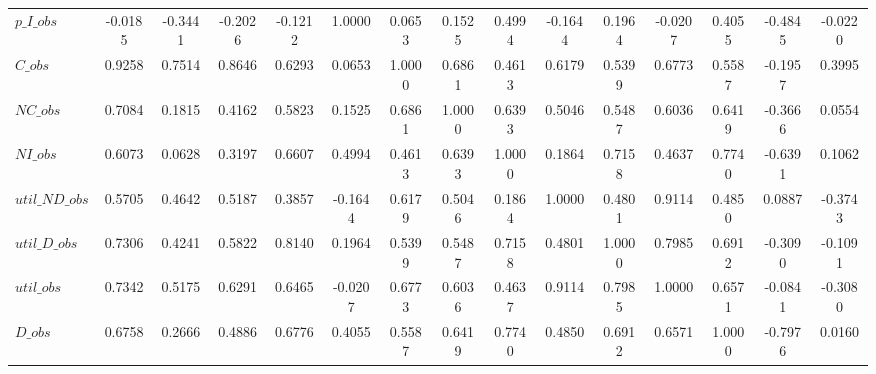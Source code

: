 \begin{center}
\begin{longtable}{lcccccccccccccc}
$p\_I\_obs      $	 & 	          -0.0185	 & 	          -0.3441	 & 	          -0.2026	 & 	          -0.1212	 & 	           1.0000	 & 	           0.0653	 & 	           0.1525	 & 	           0.4994	 & 	          -0.1644	 & 	           0.1964	 & 	          -0.0207	 & 	           0.4055	 & 	          -0.4845	 & 	          -0.0220 \\ 
$C\_obs         $	 & 	           0.9258	 & 	           0.7514	 & 	           0.8646	 & 	           0.6293	 & 	           0.0653	 & 	           1.0000	 & 	           0.6861	 & 	           0.4613	 & 	           0.6179	 & 	           0.5399	 & 	           0.6773	 & 	           0.5587	 & 	          -0.1957	 & 	           0.3995 \\ 
$NC\_obs        $	 & 	           0.7084	 & 	           0.1815	 & 	           0.4162	 & 	           0.5823	 & 	           0.1525	 & 	           0.6861	 & 	           1.0000	 & 	           0.6393	 & 	           0.5046	 & 	           0.5487	 & 	           0.6036	 & 	           0.6419	 & 	          -0.3666	 & 	           0.0554 \\ 
$NI\_obs        $	 & 	           0.6073	 & 	           0.0628	 & 	           0.3197	 & 	           0.6607	 & 	           0.4994	 & 	           0.4613	 & 	           0.6393	 & 	           1.0000	 & 	           0.1864	 & 	           0.7158	 & 	           0.4637	 & 	           0.7740	 & 	          -0.6391	 & 	           0.1062 \\ 
$util\_ND\_obs  $	 & 	           0.5705	 & 	           0.4642	 & 	           0.5187	 & 	           0.3857	 & 	          -0.1644	 & 	           0.6179	 & 	           0.5046	 & 	           0.1864	 & 	           1.0000	 & 	           0.4801	 & 	           0.9114	 & 	           0.4850	 & 	           0.0887	 & 	          -0.3743 \\ 
$util\_D\_obs   $	 & 	           0.7306	 & 	           0.4241	 & 	           0.5822	 & 	           0.8140	 & 	           0.1964	 & 	           0.5399	 & 	           0.5487	 & 	           0.7158	 & 	           0.4801	 & 	           1.0000	 & 	           0.7985	 & 	           0.6912	 & 	          -0.3090	 & 	          -0.1091 \\ 
$util\_obs      $	 & 	           0.7342	 & 	           0.5175	 & 	           0.6291	 & 	           0.6465	 & 	          -0.0207	 & 	           0.6773	 & 	           0.6036	 & 	           0.4637	 & 	           0.9114	 & 	           0.7985	 & 	           1.0000	 & 	           0.6571	 & 	          -0.0841	 & 	          -0.3080 \\ 
$D\_obs         $	 & 	           0.6758	 & 	           0.2666	 & 	           0.4886	 & 	           0.6776	 & 	           0.4055	 & 	           0.5587	 & 	           0.6419	 & 	           0.7740	 & 	           0.4850	 & 	           0.6912	 & 	           0.6571	 & 	           1.0000	 & 	          -0.7976	 & 	           0.0160 \\ 

\end{longtable}
\end{center}
